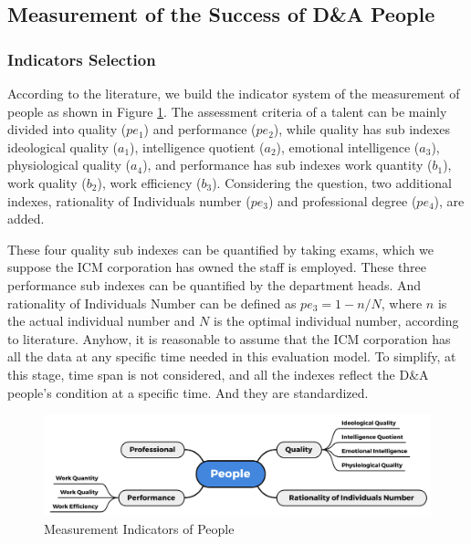 \documentclass{mcmthesis}
\begin{document}
\subsection{Measurement of the Success of D\&A People}
\subsubsection{Indicators Selection}

According to the literature, we build the indicator system of the measurement of people as shown in Figure \ref{figure::Measurement Indicators of People}. The assessment criteria of a talent can be mainly divided into quality ($pe_1$) and performance ($pe_2$), while quality has sub indexes ideological quality ($a_1$), intelligence quotient ($a_2$), emotional intelligence ($a_3$), physiological quality ($a_4$), and performance has sub indexes work quantity ($b_1$), work quality ($b_2$), work efficiency ($b_3$). Considering the question, two additional indexes, rationality of Individuals number ($pe_3$) and professional degree ($pe_4$), are added. 

These four quality sub indexes can be quantified by taking exams, which we suppose the ICM corporation has owned the staff is employed. These three performance sub indexes can be quantified by the department heads. And rationality of Individuals Number can be defined as
$pe_3 = 1-n/N$, where $n$ is the actual individual number and $N$ is the optimal individual number, according to literature. Anyhow, it is reasonable to assume that the ICM corporation has all the data at any specific time needed in this evaluation model. To simplify, at this stage, time span is not considered, and all the indexes reflect the D\&A people's condition at a specific time. And they are standardized.

\begin{figure}[!htbp]
    \small
    \centering
    \includegraphics[width=12cm]{figures/IndicatorsofPeople.png}
    \caption{Measurement Indicators of People} 
    \label{figure::Measurement Indicators of People}
\end{figure}%
\end{document}

